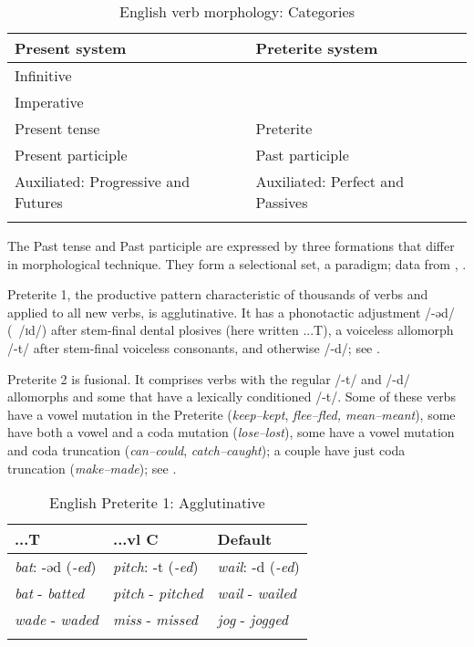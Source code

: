 \documentclass[output=paper, colorlinks,citecolor=brown]{langsci/langscibook}
\begin{document}
\begin{table}
\caption{English verb morphology: Categories\label{tab:andersen_7}}
\begin{tabular}{ll}
\lsptoprule
Present system & Preterite system  \\
\midrule
Infinitive & \\
Imperative & \\
Present tense & Preterite\\
Present participle & Past participle\\
Auxiliated: Progressive and Futures & Auxiliated: Perfect and Passives\\
\lspbottomrule
\end{tabular}
\end{table}

The Past tense and Past participle are expressed by three formations that differ in morphological technique. They form a selectional set, a paradigm; data from \citet{Bloch1947}, \citet[249–257]{Palmer1987}.

Preterite 1, the productive pattern characteristic of thousands of verbs and applied to all new verbs, is agglutinative. It has a phonotactic adjustment /-ǝd/ \mbox{({\textbar}{\textbar} /\textsc{i}d/)} after stem-final dental plosives (here written ...T), a voiceless allomorph /-t/ after stem-final voiceless consonants, and otherwise /-d/; see .

Preterite 2 is fusional. It comprises verbs with the regular /-t/ and /-d/ allomorphs and some that have a lexically conditioned /-t/. Some of these verbs have a vowel mutation in the Preterite (\textit{keep–kept}, \textit{flee–fled, mean–meant}), some have both a vowel and a coda mutation (\textit{lose–lost}), some have a vowel mutation and coda truncation (\textit{can–could}, \textit{catch–caught}); a couple have just coda truncation (\textit{make–made}); see . 

\begin{table}
\caption{English Preterite 1: Agglutinative\label{tab:andersen_8}}
\begin{tabular}{lll}
\lsptoprule
...T{\longrule} & ...vl C{\longrule} & Default\\\midrule
\textit{bat}: -ǝd (\textit{{}-ed}) & \textit{pitch}: -t (\textit{{}-ed}) & \textit{wail}: -d (\textit{{}-ed})\\
\textit{bat} - \textit{batted} & \textit{pitch} - \textit{pitched} & \textit{wail} - \textit{wailed}\\
\textit{wade} - \textit{waded}  & \textit{miss} - \textit{missed} & \textit{jog} - \textit{jogged}\\
\lspbottomrule
\end{tabular}
\end{table}
\end{document}
